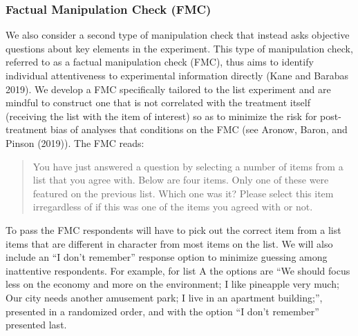 \documentclass[]{article}
\begin{document}
\hypertarget{factual-manipulation-check-fmc}{%
\subsubsection{Factual Manipulation Check
(FMC)}\label{factual-manipulation-check-fmc}}

We also consider a second type of manipulation check that instead asks
objective questions about key elements in the experiment. This type of
manipulation check, referred to as a factual manipulation check (FMC),
thus aims to identify individual attentiveness to experimental
information directly (Kane and Barabas 2019). We develop a FMC
specifically tailored to the list experiment and are mindful to
construct one that is not correlated with the treatment itself
(receiving the list with the item of interest) so as to minimize the
risk for post-treatment bias of analyses that conditions on the FMC (see
Aronow, Baron, and Pinson (2019)). The FMC reads:

\begin{quote}
You have just answered a question by selecting a number of items from a
list that you agree with. Below are four items. Only one of these were
featured on the previous list. Which one was it? Please select this item
irregardless of if this was one of the items you agreed with or not.
\end{quote}

To pass the FMC respondents will have to pick out the correct item from
a list items that are different in character from most items on the
list. We will also include an ``I don't remember'' response option to
minimize guessing among inattentive respondents. For example, for list A
the options are ``We should focus less on the economy and more on the
environment; I like pineapple very much; Our city needs another
amusement park; I live in an apartment building;'', presented in a
randomized order, and with the option ``I don't remember'' presented
last.
\end{document}
